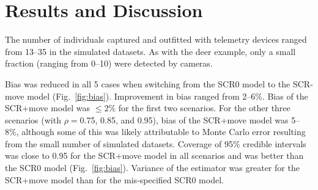 \documentclass[12pt]{article}
\begin{document}
  


\section*{Results and Discussion}

The number of individuals captured and outfitted with telemetry
devices ranged from 13--35 in the simulated datasets. As with the deer
example, only a small fraction (ranging from 0--10) were detected by
cameras. 

Bias was reduced in all 5 cases when switching from the SCR0 model to
the SCR-move model (Fig.~\ref{fig:bias}). Improvement in bias ranged
from 2--6\%. Bias of the SCR+move model was $\le2\%$ for the first two
scenarios. For the other three scenarios (with 
$\rho=$0.75, 0.85, and 0.95), bias of the SCR+move model was
5--8\%, although some of this was likely attributable to Monte Carlo
error resulting from the small number of simulated datasets.
Coverage of 95\% credible intervals was close to 0.95 for
the SCR+move model in all scenarios and was better than the SCR0 model
(Fig.~\ref{fig:bias}). Variance of the estimator was greater for the
SCR+move model than for the mis-specified SCR0 model.


\clearpage
\end{document}
